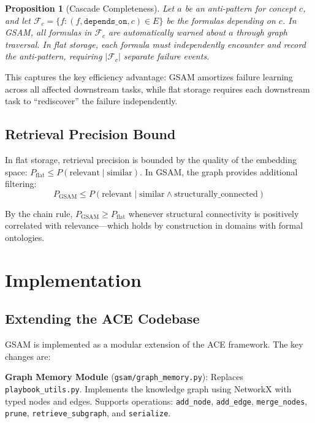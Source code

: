 \documentclass[12pt,a4paper]{article}
\newtheorem{proposition}{Proposition}
\begin{document}
\begin{proposition}[Cascade Completeness]
Let $a$ be an anti-pattern for concept $c$, and let $\mathcal{F}_c = \{f : (f, \texttt{depends\_on}, c) \in E\}$ be the formulas depending on $c$. In GSAM, all formulas in $\mathcal{F}_c$ are automatically warned about $a$ through graph traversal. In flat storage, each formula must independently encounter and record the anti-pattern, requiring $|\mathcal{F}_c|$ separate failure events.
\end{proposition}

This captures the key efficiency advantage: GSAM amortizes failure learning across all affected downstream tasks, while flat storage requires each downstream task to ``rediscover'' the failure independently.

\subsection{Retrieval Precision Bound}

In flat storage, retrieval precision is bounded by the quality of the embedding space: $P_{\text{flat}} \leq P(\text{relevant} \mid \text{similar})$. In GSAM, the graph provides additional filtering:
\begin{equation}
P_{\text{GSAM}} \leq P(\text{relevant} \mid \text{similar} \land \text{structurally\_connected})
\end{equation}

By the chain rule, $P_{\text{GSAM}} \geq P_{\text{flat}}$ whenever structural connectivity is positively correlated with relevance---which holds by construction in domains with formal ontologies.


\section{Implementation}
\label{sec:implementation}

\subsection{Extending the ACE Codebase}

GSAM is implemented as a modular extension of the ACE framework. The key changes are:

\textbf{Graph Memory Module} (\texttt{gsam/graph\_memory.py}): Replaces \texttt{playbook\_utils.py}. Implements the knowledge graph using NetworkX with typed nodes and edges. Supports operations: \texttt{add\_node}, \texttt{add\_edge}, \texttt{merge\_nodes}, \texttt{prune}, \texttt{retrieve\_subgraph}, and \texttt{serialize}.
\end{document}
